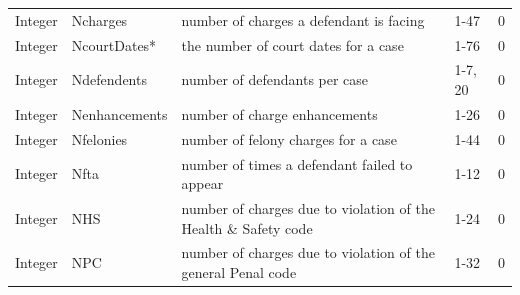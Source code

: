 \documentclass{AISB2008}
\begin{document}
\begin{table}
\begin{tabular}{llp{8cm}p{5cm}l}
Integer     & Ncharges             & number of charges a defendant is facing                                                                 & 1-47                                                                                                                              & 0              \\
Integer     & NcourtDates*         & the number of court dates for a case                                                                    & 1-76                                                                                                                              & 0              \\
Integer     & Ndefendents          & number of defendants per case                                                                           & 1-7, 20                                                                                                                           & 0              \\
Integer     & Nenhancements        & number of charge enhancements                                                                           & 1-26                                                                                                                              & 0              \\
Integer     & Nfelonies            & number of felony charges for a case                                                                     & 1-44                                                                                                                              & 0              \\
Integer     & Nfta                 & number of times a defendant failed to appear                                                            & 1-12                                                                                                                              & 0              \\
Integer     & NHS                  & number of charges due to violation of the Health \& Safety code                                         & 1-24                                                                                                                              & 0              \\
Integer     & NPC                  & number of charges due to violation of the general Penal code                                            & 1-32                                                                                                                              & 0              \\

\end{tabular}
\end{table}
\end{document}
